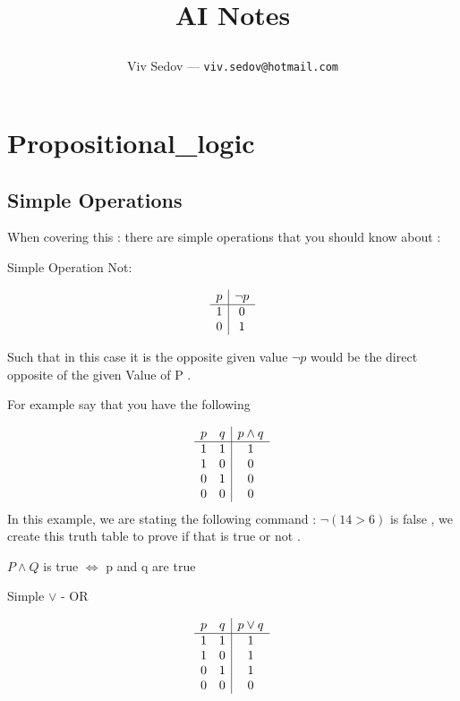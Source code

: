 \documentclass{article}
\theoremstyle{mytheoremstyle}
\theoremstyle{mytheoremstyle}
\theoremstyle{myproblemstyle}
\begin{document}
\title{
	AI Notes

}
\author{
	Viv Sedov --- \texttt{viv.sedov@hotmail.com}
}
\maketitle

\tableofcontents

\newpage



\section{Propositional\_logic}

\subsection{Simple Operations}
When covering this : there are simple operations that you should know about :

Simple Operation Not:

\[\begin{array}{c | c}
		p & \neg p \\
		\hline
		1 & 0      \\
		0 & 1
	\end{array}
\]

Such that in this case it is the opposite given value $\neg p $ would be the direct opposite of the given Value of P .

For example say that you have the following

\[\begin{array}{c c | c}
		p & q & p \land q \\
		\hline
		1 & 1 & 1         \\
		1 & 0 & 0         \\
		0 & 1 & 0         \\
		0 & 0 & 0
	\end{array}\]
In this example, we are stating the following command : $\neg(14 > 6)$ is false , we create this truth table to prove if that is true or not .

$P \land Q $ is true $\iff$ p and q are true

Simple $\lor$ - OR


\[\begin{array}{c c | c}
		p & q & p \lor q \\
		\hline
		1 & 1 & 1        \\
		1 & 0 & 1        \\
		0 & 1 & 1        \\
		0 & 0 & 0        \\
	\end{array}\]
\end{document}
